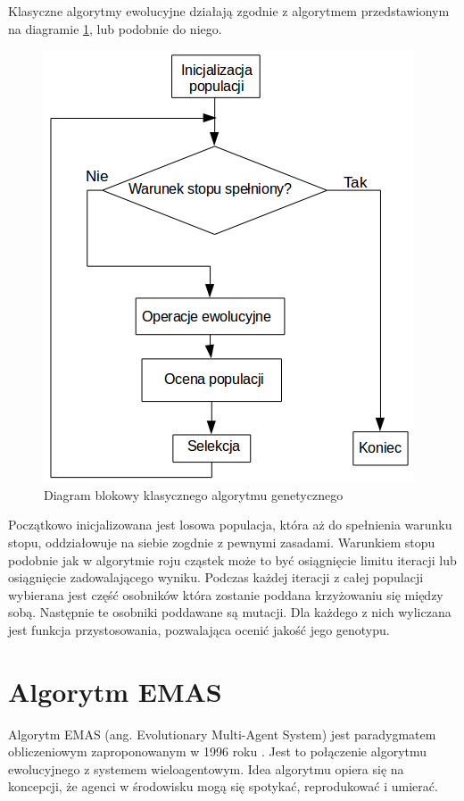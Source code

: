 Klasyczne algorytmy ewolucyjne działają zgodnie z algorytmem przedstawionym na diagramie \ref{fig:GAdiagram}, lub podobnie do niego. 

\begin{figure}[H]
\begin{center} 
\includegraphics[scale=0.6]{tresc/pics/GAdiagram.png}
\caption{Diagram blokowy klasycznego algorytmu genetycznego}
\label{fig:GAdiagram}
\end{center}
\end{figure}

Początkowo inicjalizowana jest losowa populacja, która aż do spełnienia warunku stopu, oddziałowuje na siebie zogdnie z pewnymi zasadami. Warunkiem stopu podobnie jak w algorytmie roju cząstek może to być osiągnięcie limitu iteracji lub osiągnięcie zadowalającego wyniku. Podczas każdej iteracji z całej populacji wybierana jest część osobników która zostanie poddana krzyżowaniu się między sobą. Następnie te osobniki poddawane są mutacji. Dla każdego z nich wyliczana jest funkcja przystosowania, pozwalająca ocenić jakość jego genotypu.

\section{Algorytm EMAS}

Algorytm EMAS (ang. Evolutionary Multi-Agent System) jest paradygmatem obliczeniowym zaproponowanym w 1996 roku \cite{emas1}. Jest to połączenie algorytmu ewolucyjnego z systemem wieloagentowym. Idea algorytmu opiera się na koncepcji, że agenci w środowisku mogą się spotykać, reprodukować i umierać. 

